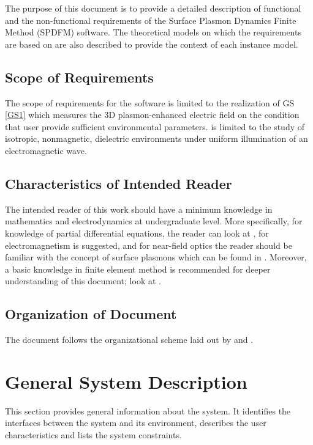 \documentclass[12pt]{article}
\begin{document}
	The purpose of this document is to provide a detailed description of functional
	and the non-functional requirements of the Surface Plasmon Dynamics Finite
	Method (SPDFM) software. The theoretical models on which the requirements are
	based on are also described to provide the context of each instance model.
	
	\subsection{Scope of Requirements}
	
	The scope of requirements for the software \progname{} is limited to the realization
of GS \ref{GS1} which measures the 3D plasmon-enhanced electric field on the
condition that user provide sufficient environmental parameters. \progname{} is
limited to the study of isotropic, nonmagnetic, dielectric environments under
uniform illumination of an electromagnetic wave.
	
	\subsection{Characteristics of Intended Reader} \label{sec_IntendedReader} The
	intended reader of this work should have a minimum knowledge in mathematics and
	electrodynamics at undergraduate level. More specifically, for knowledge of
	partial differential equations, the reader can look at 
	\cite{boyce2012elementary}, for electromagnetism 
	\cite{griffiths1962introduction} is suggested, and for near-field optics the
	reader should be familiar with the concept of surface plasmons  which can be
	found in \cite{maier2007plasmonics}. Moreover, a basic knowledge in finite
	element method is recommended for deeper understanding of this document; look at
	\cite{monk2003finite}.
	
	
	\subsection{Organization of Document}
	
	The document follows the organizational scheme laid out by
	\cite{SmithAndLai2005} and  \cite{SmithEtAl2007}.
	
	
	\section{General System Description}
	
	This section provides general information about the system.  It identifies the
	interfaces between the system and its environment, describes the user
	characteristics and lists the system constraints.
	
\end{document}
